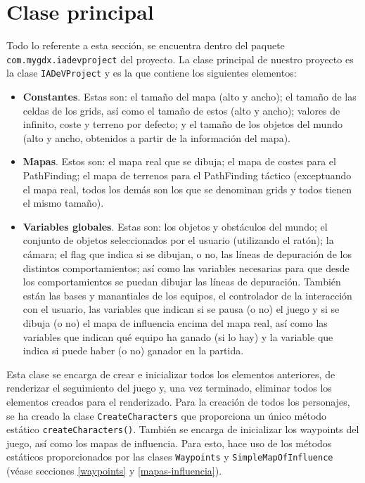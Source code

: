 \medskip
\section{Clase principal}
Todo lo referente a esta sección, se encuentra dentro del paquete \texttt{com.mygdx.iadevproject} del proyecto. La clase principal de nuestro proyecto es la clase \texttt{IADeVProject} y es la que contiene los siguientes elementos:
\begin{itemize}
 \item \textbf{Constantes}. Estas son: el tamaño del mapa (alto y ancho); el tamaño de las celdas de los grids, así como el tamaño de estos (alto y ancho); valores de infinito, coste y terreno por defecto; y el tamaño de los objetos del mundo (alto y ancho, obtenidos a partir de la información del mapa).
 \item \textbf{Mapas}. Estos son: el mapa real que se dibuja; el mapa de costes para el PathFinding; el mapa de terrenos para el PathFinding táctico (exceptuando el mapa real, todos los demás son los que se denominan grids y todos tienen el mismo tamaño).
 \item \textbf{Variables globales}. Estas son: los objetos y obstáculos del mundo; el conjunto de objetos seleccionados por el usuario (utilizando el ratón); la cámara; el flag que indica si se dibujan, o no, las líneas de depuración de los distintos comportamientos; así como las variables necesarias para que desde los comportamientos se puedan dibujar las líneas de depuración. También están las bases y manantiales de los equipos, el controlador de la interacción con el usuario, las variables que indican si se pausa (o no) el juego y si se dibuja (o no) el mapa de influencia encima del mapa real, así como las variables que indican qué equipo ha ganado (si lo hay) y la variable que indica si puede haber (o no) ganador en la partida.
\end{itemize}

Esta clase se encarga de crear e inicializar todos los elementos anteriores, de renderizar el seguimiento del juego y, una vez terminado, eliminar todos los elementos creados para el renderizado. Para la creación de todos los personajes, se ha creado la clase \texttt{CreateCharacters} que proporciona un único método estático \texttt{createCharacters()}. También se encarga de inicializar los waypoints del juego, así como los mapas de influencia. Para esto, hace uso de los métodos estáticos proporcionados por las clases \texttt{Waypoints} y \texttt{SimpleMapOfInfluence} (véase secciones \ref{waypoints} y \ref{mapas-influencia}).\\

